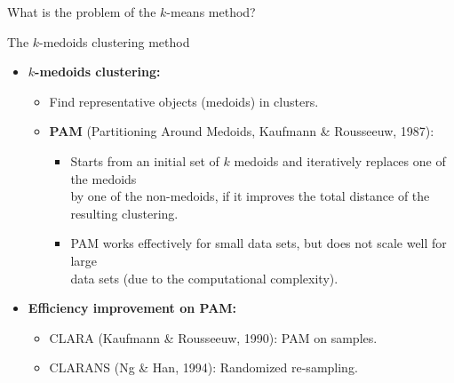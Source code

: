 \documentclass[aspectratio=169,t,xcolor=dvipsnames]{beamer}
\begin{document}
{\begin{frame}{What is the problem of the $k$-means method?}
    \end{frame}
  }

  {
    \begin{frame}{The $k$-medoids clustering method}
      \begin{itemize}
        \item \textbf{$k$-medoids clustering:}
        \begin{itemize}
          \item Find representative objects (medoids) in clusters.
          \item \textbf{PAM} (Partitioning Around Medoids, Kaufmann \& Rousseeuw, 1987):
            \begin{itemize}
              \item Starts from an initial set of $k$ medoids and iteratively replaces one of the medoids \\
              by one of the non-medoids, if it improves the total distance of the resulting clustering.
              \item PAM works effectively for small data sets, but does not scale well for large\\
              data sets (due to the computational complexity).
            \end{itemize}
            \end{itemize}
        \item \textbf{Efficiency improvement on PAM: }
        \begin{itemize}
          \item CLARA (Kaufmann \& Rousseeuw, 1990): PAM on samples.
          \item CLARANS (Ng \& Han, 1994): Randomized re-sampling.
        \end{itemize}
      \end{itemize}
    \end{frame}
  }
\end{document}
